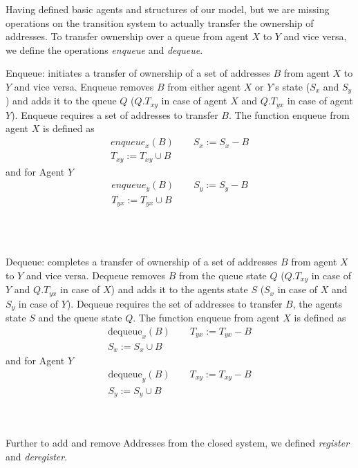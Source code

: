 \documentclass[a4paper,11pt,twoside]{report}
\begin{document}
	Having defined basic agents and structures of our model, but we are missing operations 
	on the transition system to actually transfer the ownership of addresses. To transfer 
	ownership over a queue from agent $X$ to $Y$ and vice versa, we define
	the operations \textit{enqueue} and \textit{dequeue}. 
	\\
	\begin{op} [Enqueue]
		Enqueue: initiates a transfer of ownership of a set of addresses $B$ from agent $X$ to $Y$ and vice versa. 
		Enqueue removes $B$ from either agent $X$ or $Y$'s state ($S_x$ and $S_y$) and adds it to the 
		queue $Q$ ($Q.T_{xy}$ in case of agent $X$ and $Q.T_{yx}$ in case of agent $Y$). Enqueue requires a 
		set of addresses to transfer $B$. The function enqueue from agent $X$ is defined as
		\begin{align*} enqueue_{x}(B) \quad \quad S_x := S_x - B \\
		T_{xy} := T_{xy} \cup B  
		\end{align*}
		and for Agent $Y$
		\begin{align*} enqueue_{y}(B) \quad \quad S_y := S_y - B \\
		T_{yx} := T_{yx} \cup B 
		\end{align*}
	\end{op}
	\\
	\\
	\begin{op}[Dequeue]
		Dequeue: completes a transfer of ownership of a set of addresses $B$ from agent $X$ to $Y$ 
		and vice versa. Dequeue removes $B$ from the queue state $Q$ ($Q.T_{xy}$ in case of $Y$ 
		and $Q.T_{yx}$ in case of $X$) and adds it to the agents state $S$ ($S_x$ in case of $X$ and 
		$S_y$ in case of $Y$). Dequeue requires the set of addresses to transfer $B$, the agents state 
		$S$ and the queue state $Q$. The function enqueue from agent $X$ is defined as
		\begin{align*} \text{dequeue}_{x}(B) \quad \quad T_{yx} := T_{yx} - B \\
		S_x := S_x \cup B  
		\end{align*}
		and for Agent $Y$
		\begin{align*} \text{dequeue}_{y}(B) \quad \quad T_{xy} := T_{xy} - B \\
		S_y := S_y \cup B  
		\end{align*}
	\end{op}
	\\
	\\
	Further to add and remove Addresses from the closed system, we defined \textit{register} and \textit{deregister}.
\end{document}
